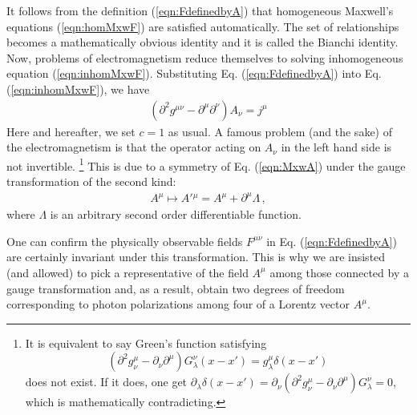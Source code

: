 It follows from the definition (\ref{eqn:FdefinedbyA}) that
homogeneous Maxwell's equations (\ref{eqn:homMxwF})
are satisfied automatically. The set of relationships becomes
a mathematically obvious identity and it is called
the Bianchi identity.
Now, problems of electromagnetism reduce themselves to solving inhomogeneous
equation (\ref{eqn:inhomMxwF}). Substituting Eq. (\ref{eqn:FdefinedbyA}) into
Eq. (\ref{eqn:inhomMxwF}), we have
\begin{eqnarray}
(\partial^2 g^{\mu \nu} - \partial^\mu \partial^\nu) A_\nu = j^\mu
\label{eqn:MxwA}
\end{eqnarray}
Here and hereafter, we set $c = 1$ as usual.
A famous problem (and the sake) of the electromagnetism is that
the operator acting on $A_\nu$ in the left hand side
is not invertible.
\footnote{%
It is equivalent to say Green's function satisfying 
\[(\partial^2 g^\mu_\nu
 - \partial_\nu \partial^\mu) G^\nu_\lambda (x-x')=
 g^\mu_\lambda \delta(x -x')
\]
does not exist. If it does, one get
$\partial_\lambda \delta(x - x') = \partial_\nu 
(\partial^2 g^\mu_\nu - \partial_\nu \partial^\mu) G^\nu_\lambda
= 0$,
which is mathematically contradicting.}%
This is due to a symmetry of Eq. (\ref{eqn:MxwA}) under the gauge transformation
of the second kind:
\begin{eqnarray}
A^\mu \mapsto A'{}^{\mu} = A^\mu + \partial^\mu \Lambda\,,
\end{eqnarray}
where $\Lambda$ is an arbitrary second order differentiable function.
\begin{comment}
\end{comment}
One can confirm the physically observable fields $F^{\mu \nu}$ in Eq. (\ref{eqn:FdefinedbyA}) 
are certainly invariant under this transformation. 
This is why we are insisted (and allowed) to pick a representative of the field $A^\mu$
among those connected by a gauge transformation
and, as a result, obtain two degrees of freedom corresponding to photon polarizations
among four of a Lorentz vector $A^\mu$.


